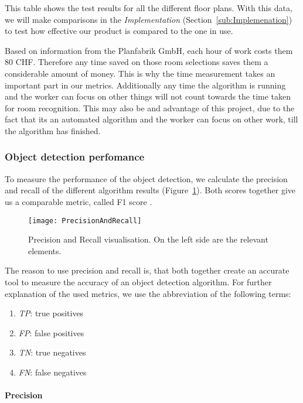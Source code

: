 This table shows the test results for all the different floor plans. With this data, we will make comparisons in the \textit{Implementation} (Section~\ref{sub:Implemenation}) to test how effective our product is compared to the one in use.

Based on information from the Planfabrik GmbH, each hour of work costs them 80 CHF. Therefore any time saved on those room selections saves them a considerable amount of money. This is why the time measurement takes an important part in our metrics. Additionally any time the algorithm is running and the worker can focus on other things will not count towards the time taken for room recognition. This may also be and advantage of this project, due to the fact that its an automated algorithm and the worker can focus on other work, till the algorithm has finished.

\subsubsection{Object detection perfomance}
\label{sub:ObjectDetectionPerfomance}

To measure the performance of the object detection, we calculate the precision and recall of the different algorithm results (Figure~\ref{fig:PrecisionAndRecall}). Both scores together give us a comparable metric, called F1 score \citep{sokolova_lapalme_2009}.

\begin{figure}[H]
	\centering
	\texttt{[image: PrecisionAndRecall]}
	\caption{Precision and Recall visualisation. On the left side are the relevant elements.}
	\label{fig:PrecisionAndRecall}
\end{figure}

The reason to use precision and recall is, that both together create an accurate tool to measure the accuracy of an object detection algorithm. For further explanation of the used metrics, we use the abbreviation of the following terms:

\begin{enumerate}[label=]
    \item \textit{TP}: true positives
    \item \textit{FP}: false positives
    \item \textit{TN}: true negatives
    \item \textit{FN}: false negatives
\end{enumerate}

\paragraph{Precision}
\label{sub:Precision}

